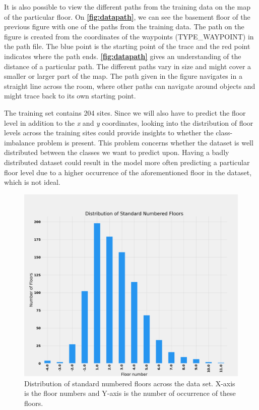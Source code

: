 It is also possible to view the different paths from the training data on the map of the particular floor. On \textbf{\autoref{fig:datapath}}, we can see the basement floor of the previous figure with one of the paths from the training data. The path on the figure is created from the coordinates of the waypoints (TYPE\_WAYPOINT) in the path file. The blue point is the starting point of the trace and the red point indicates where the path ends. \textbf{\autoref{fig:datapath}} gives an understanding of the distance of a particular path. The different paths vary in size and might cover a smaller or larger part of the map. The path given in the figure navigates in a straight line across the room, where other paths can navigate around objects and might trace back to its own starting point.

The training set contains 204 sites. Since we will also have to predict the floor level in addition to the \textit{x} and \textit{y} coordinates, looking into the distribution of floor levels across the training sites could provide insights to whether the class-imbalance problem is present. This problem concerns whether the dataset is well distributed between the classes we want to predict upon. Having a badly distributed dataset could result in the model more often predicting a particular floor level due to a higher occurrence of the aforementioned floor in the dataset, which is not ideal.\cite{Han_Kamber_2012}

\begin{figure}[H]
    \centering
    \includegraphics[scale=.15]{Images/ProblemAnalysis/datadistribution1.png}
    \caption{Distribution of standard numbered floors across the data set. X-axis is the floor numbers and Y-axis is the number of occurrence of these floors.}
    \label{fig:datadistribution}
\end{figure}

